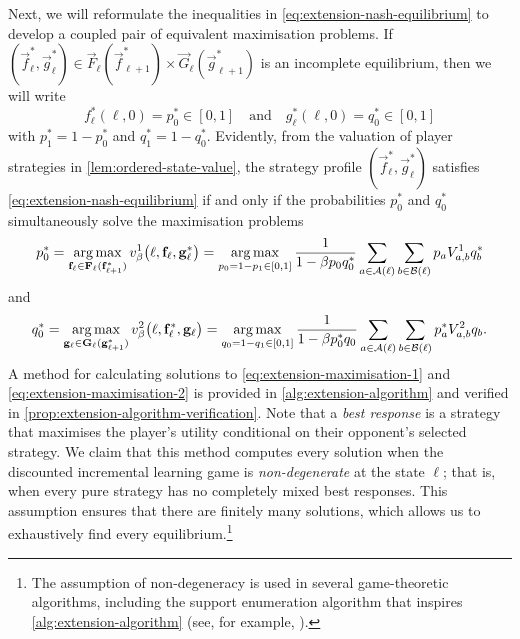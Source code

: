    Next, we will reformulate the inequalities in \eqref{eq:extension-nash-equilibrium} to develop a coupled pair of equivalent maximisation problems.
    If $(\vec{f}^*_\ell, \vec{g}^*_\ell) \in \vec{F}_\ell(\vec{f}^*_{\ell + 1}) \times \vec{G}_\ell(\vec{g}^*_{\ell + 1})$ is an incomplete equilibrium, then we will write
    \[
        f^*_\ell(\ell, 0) 
            = p^*_0 
            \in [0, 1]
        \quad\text{and}\quad
        g^*_\ell(\ell, 0)
            = q^*_0
            \in [0, 1]
    \]
    with $p^*_1 = 1 - p^*_0$ and $q^*_1 = 1 - q^*_0$.
    Evidently, from the valuation of player strategies in \autoref{lem:ordered-state-value}, the strategy profile $(\vec{f}^*_\ell, \vec{g}^*_\ell)$ satisfies \eqref{eq:extension-nash-equilibrium} if and only if the probabilities $p^*_0$ and $q^*_0$ simultaneously solve the maximisation problems
    \begin{equation}  \label{eq:extension-maximisation-1}
        p^*_0
            = \operatorname*{arg\,max}_{\mathbf{f}_\ell \in \mathbf{F}_\ell(\mathbf{f}^*_{\ell + 1})} v^1_\beta\big(\ell, \mathbf{f}_\ell, \mathbf{g}^*_\ell\big)
            = \operatorname*{arg\,max}_{p_0 = 1 - p_1 \in [0, 1]} \frac{1}{1 - \beta p_0 q^*_0} \sum_{a \in \mathcal{A}(\ell)} \sum_{b \in \mathcal{B}(\ell)} p_a V^1_{a, b} q^*_b
    \end{equation}
    and
    \begin{equation}  \label{eq:extension-maximisation-2}
        q^*_0
            = \operatorname*{arg\,max}_{\mathbf{g}_\ell \in \mathbf{G}_\ell(\mathbf{g}^*_{\ell + 1})} v^2_\beta\big(\ell, \mathbf{f}^*_\ell, \mathbf{g}_\ell\big)
            = \operatorname*{arg\,max}_{q_0 = 1 - q_1 \in [0, 1]} \frac{1}{1 - \beta p^*_0 q_0} \sum_{a \in \mathcal{A}(\ell)} \sum_{b \in \mathcal{B}(\ell)} p^*_a V^2_{a, b} q_b.
    \end{equation}
    A method for calculating solutions to \eqref{eq:extension-maximisation-1} and \eqref{eq:extension-maximisation-2} is provided in \autoref{alg:extension-algorithm} and verified in \autoref{prop:extension-algorithm-verification}.
    Note that a \emph{best response} is a strategy that maximises the player's utility conditional on their opponent's selected strategy.
    We claim that this method computes every solution when the discounted incremental learning game is \emph{non-degenerate} at the state $\ell$; that is, when every pure strategy has no completely mixed best responses.
    This assumption ensures that there are finitely many solutions, which allows us to exhaustively find every equilibrium.\footnote{The
        assumption of non-degeneracy is used in several game-theoretic algorithms, including the support enumeration algorithm that inspires \autoref{alg:extension-algorithm} (see, for example, \parencite[Algorithm 3.4]{vonStengel2007}).
    }

